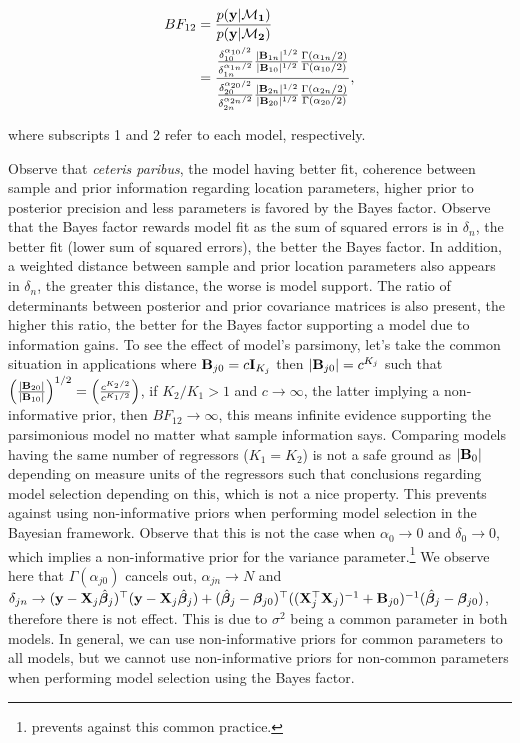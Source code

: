 \begin{align*}
	BF_{12}&=\frac{p(\bf{y}|\mathcal{M}_1)}{p(\bf{y}|\mathcal{M}_2)}\\
	&=\frac{\frac{\delta_{10}^{\alpha_{10}/2}}{\delta_{1n}^{\alpha_{1n}/2}}\frac{|{\bf{B}}_{1n}|^{1/2}}{|{\bf{B}}_{10}|^{1/2}}\frac{\Gamma(\alpha_{1n}/2)}{\Gamma(\alpha_{10}/2)}}{\frac{\delta_{20}^{\alpha_{20}/2}}{\delta_{2n}^{\alpha_{2n}/2}}\frac{|{\bf{B}}_{2n}|^{1/2}}{|{\bf{B}}_{20}|^{1/2}}\frac{\Gamma(\alpha_{2n}/2)}{\Gamma(\alpha_{20}/2)}},
\end{align*}

where subscripts 1 and 2 refer to each model, respectively.

Observe that \textit{ceteris paribus}, the model having better fit, coherence between sample and prior information regarding location parameters, higher prior to posterior precision and less parameters is favored by the Bayes factor. Observe that the Bayes factor rewards model fit as the sum of squared errors is in $\delta_n$, the better fit (lower sum of squared errors), the better the Bayes factor. In addition, a weighted distance between sample and prior location parameters also appears in $\delta_n$, the greater this distance, the worse is model support. The ratio of determinants between posterior and prior covariance matrices is also present, the higher this ratio, the better for the Bayes factor supporting a model due to information gains. To see the effect of model's parsimony, let's take the common situation in applications where ${\bf{B}}_{j0}=c{\bf{I}}_{K_j}$ then $|{\bf{B}}_{j0}|=c^{K_j}$ such that $\left(\frac{|{\bf{B}}_{20}|}{|{\bf{B}}_{10}|}\right)^{1/2}=\left(\frac{c^{K_2/2}}{c^{K_1/2}}\right)$, if $K_2/K_1>1$ and $c\rightarrow\infty$, the latter implying a non-informative prior, then $BF_{12}\rightarrow\infty$, this means infinite evidence supporting the parsimonious model no matter what sample information says. Comparing models having the same number of regressors ($K_1=K_2$) is not a safe ground as $|{\bf{B}}_{0}|$ depending on measure units of the regressors such that conclusions regarding model selection depending on this, which is not a nice property. This prevents against using non-informative priors when performing model selection in the Bayesian framework. Observe that this is not the case when $\alpha_0\rightarrow 0$ and $\delta_0\rightarrow 0$, which implies a non-informative prior for the variance parameter.\footnote{\cite{gelman2006prior} prevents against this common practice.} We observe here that $\Gamma(\alpha_{j0})$ cancels out, $\alpha_{jn} \rightarrow N$ and $\delta_{jn}\rightarrow ({\bf{y}}-{\bf{X}}_j\hat{\bm{\beta}}_j)^{\top}({\bf{y}}-{\bf{X}}_j\hat{\bm{\beta}}_j)+(\hat{\bm{\beta}}_j-\bm{\beta}_{j0})^{\top}(({\bf{X}}_j^{\top}{\bf{X}}_j)^{-1}+{\bf{B}}_{j0})^{-1}(\hat{\bm{\beta}}_j-\bm{\beta}_{j0})$, therefore there is not effect. This is due to $\sigma^2$ being a common parameter in both models. In general, we can use non-informative priors for common parameters to all models, but we cannot use non-informative priors for non-common parameters when performing model selection using the Bayes factor. 


